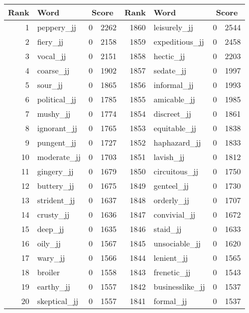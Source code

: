 \begin{table}[tbp]
    \begin{tabular}{| rlr@{.}l | rlr@{.}l |}
    \hline
    \textbf{Rank} & \textbf{Word} & \multicolumn{2}{c|}{\textbf{Score}} & \textbf{Rank} & \textbf{Word} & \multicolumn{2}{c|}{\textbf{Score}} \\
    \hline
    1 & peppery\_jj & 0 & 2262    &    1860 & leisurely\_jj & 0 & 2544 \\
    2 & fiery\_jj & 0 & 2158    &    1859 & expeditious\_jj & 0 & 2458 \\
    3 & vocal\_jj & 0 & 2151    &    1858 & hectic\_jj & 0 & 2203 \\
    4 & coarse\_jj & 0 & 1902    &    1857 & sedate\_jj & 0 & 1997 \\
    5 & sour\_jj & 0 & 1865    &    1856 & informal\_jj & 0 & 1993 \\
    6 & political\_jj & 0 & 1785    &    1855 & amicable\_jj & 0 & 1985 \\
    7 & mushy\_jj & 0 & 1774    &    1854 & discreet\_jj & 0 & 1861 \\
    8 & ignorant\_jj & 0 & 1765    &    1853 & equitable\_jj & 0 & 1838 \\
    9 & pungent\_jj & 0 & 1727    &    1852 & haphazard\_jj & 0 & 1833 \\
    10 & moderate\_jj & 0 & 1703    &    1851 & lavish\_jj & 0 & 1812 \\
    11 & gingery\_jj & 0 & 1679    &    1850 & circuitous\_jj & 0 & 1750 \\
    12 & buttery\_jj & 0 & 1675    &    1849 & genteel\_jj & 0 & 1730 \\
    13 & strident\_jj & 0 & 1637    &    1848 & orderly\_jj & 0 & 1707 \\
    14 & crusty\_jj & 0 & 1636    &    1847 & convivial\_jj & 0 & 1672 \\
    15 & deep\_jj & 0 & 1635    &    1846 & staid\_jj & 0 & 1633 \\
    16 & oily\_jj & 0 & 1567    &    1845 & unsociable\_jj & 0 & 1620 \\
    17 & wary\_jj & 0 & 1566    &    1844 & lenient\_jj & 0 & 1565 \\
    18 & broiler & 0 & 1558    &    1843 & frenetic\_jj & 0 & 1543 \\
    19 & earthy\_jj & 0 & 1557    &    1842 & businesslike\_jj & 0 & 1537 \\
    20 & skeptical\_jj & 0 & 1557    &    1841 & formal\_jj & 0 & 1537 \\

\end{tabular}
\end{table}
